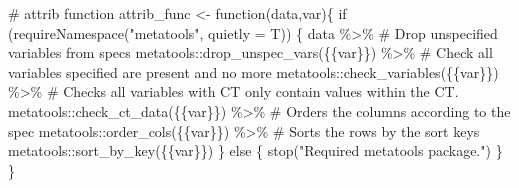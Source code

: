 \documentclass[
  letterpaper,
  DIV=11,
  numbers=noendperiod]{scrreprt}
\newenvironment{Shaded}{\begin{snugshade}}{\end{snugshade}}
\newcommand{\AttributeTok}[1]{\textcolor[rgb]{0.40,0.45,0.13}{#1}}
\newcommand{\CommentTok}[1]{\textcolor[rgb]{0.37,0.37,0.37}{#1}}
\newcommand{\ControlFlowTok}[1]{\textcolor[rgb]{0.00,0.23,0.31}{#1}}
\newcommand{\FunctionTok}[1]{\textcolor[rgb]{0.28,0.35,0.67}{#1}}
\newcommand{\NormalTok}[1]{\textcolor[rgb]{0.00,0.23,0.31}{#1}}
\newcommand{\OtherTok}[1]{\textcolor[rgb]{0.00,0.23,0.31}{#1}}
\newcommand{\SpecialCharTok}[1]{\textcolor[rgb]{0.37,0.37,0.37}{#1}}
\newcommand{\StringTok}[1]{\textcolor[rgb]{0.13,0.47,0.30}{#1}}
\begin{document}
\begin{Shaded}
\begin{Highlighting}[]
\CommentTok{\# attrib function}
\NormalTok{attrib\_func }\OtherTok{\textless{}{-}} \ControlFlowTok{function}\NormalTok{(data,var)\{}
  \ControlFlowTok{if}\NormalTok{ (}\FunctionTok{requireNamespace}\NormalTok{(}\StringTok{"metatools"}\NormalTok{, }\AttributeTok{quietly =}\NormalTok{ T)) \{}
\NormalTok{  data }\SpecialCharTok{\%\textgreater{}\%}
    \CommentTok{\# Drop unspecified variables from specs}
\NormalTok{    metatools}\SpecialCharTok{::}\FunctionTok{drop\_unspec\_vars}\NormalTok{(\{\{var\}\}) }\SpecialCharTok{\%\textgreater{}\%}
    \CommentTok{\# Check all variables specified are present and no more}
\NormalTok{    metatools}\SpecialCharTok{::}\FunctionTok{check\_variables}\NormalTok{(\{\{var\}\}) }\SpecialCharTok{\%\textgreater{}\%}
    \CommentTok{\# Checks all variables with CT only contain values within the CT.}
\NormalTok{    metatools}\SpecialCharTok{::}\FunctionTok{check\_ct\_data}\NormalTok{(\{\{var\}\}) }\SpecialCharTok{\%\textgreater{}\%}
    \CommentTok{\# Orders the columns according to the spec}
\NormalTok{    metatools}\SpecialCharTok{::}\FunctionTok{order\_cols}\NormalTok{(\{\{var\}\}) }\SpecialCharTok{\%\textgreater{}\%}
    \CommentTok{\# Sorts the rows by the sort keys}
\NormalTok{    metatools}\SpecialCharTok{::}\FunctionTok{sort\_by\_key}\NormalTok{(\{\{var\}\})}
\NormalTok{  \}}
  \ControlFlowTok{else}\NormalTok{ \{}
    \FunctionTok{stop}\NormalTok{(}\StringTok{"Required \textquotesingle{}metatools\textquotesingle{} package."}\NormalTok{)}
\NormalTok{  \}}
\NormalTok{\}}


\end{Highlighting}
\end{Shaded}
\end{document}

